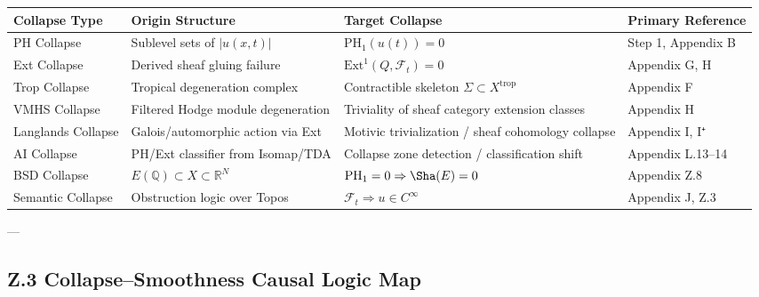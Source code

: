 \documentclass[11pt]{article}
\begin{document}
\begin{axiom}
\begin{axiom}
{{\begin{tabular}{>{\raggedright\arraybackslash}p{3.2cm} >{\raggedright\arraybackslash}p{4.0cm} >{\raggedright\arraybackslash}p{4.0cm} >{\raggedright\arraybackslash}p{2.5cm}}
\toprule
\textbf{Collapse Type} & \textbf{Origin Structure} & \textbf{Target Collapse} & \textbf{Primary Reference} \\
\midrule
PH Collapse & Sublevel sets of \( |u(x,t)| \) & \( \mathrm{PH}_1(u(t)) = 0 \) & Step 1, Appendix B \\
Ext Collapse & Derived sheaf gluing failure & \( \mathrm{Ext}^1(Q, \mathcal{F}_t) = 0 \) & Appendix G, H \\
Trop Collapse & Tropical degeneration complex & Contractible skeleton \( \Sigma \subset X^{\text{trop}} \) & Appendix F \\
VMHS Collapse & Filtered Hodge module degeneration & Triviality of sheaf category extension classes & Appendix H \\
Langlands Collapse & Galois/automorphic action via Ext & Motivic trivialization / sheaf cohomology collapse & Appendix I, I⁺ \\
AI Collapse & PH/Ext classifier from Isomap/TDA & Collapse zone detection / classification shift & Appendix L.13–14 \\
BSD Collapse & \( E(\mathbb{Q}) \subset X \subset \mathbb{R}^N \) & \( \mathrm{PH}_1 = 0 \Rightarrow \Sha(E) = 0 \) & Appendix Z.8 \\
Semantic Collapse & Obstruction logic over Topos & \( \mathcal{F}_t \Rightarrow u \in C^\infty \) & Appendix J, Z.3 \\
\bottomrule
\end{tabular}

---

\subsection*{Z.3 Collapse–Smoothness Causal Logic Map}

\begin{center}
\end{center}

}}
\end{axiom}
\end{axiom}
\end{document}
